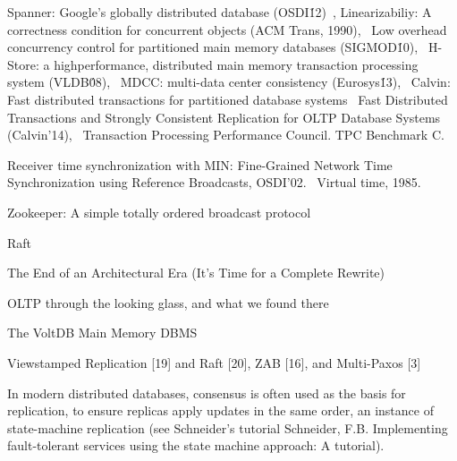 \iffalse
\parab{Bounded delay.}A network with bounded delay can improve reordering delay of \sys. Achieving bounded delay requires the queue length to be bounded and the network to be lossless. Recent years see progress in lossless data center networks~\cite{calder2013don,cheng2014catch,handley2017re} and fast detection of packet losses~\cite{li2016lossradar}.
Bounded queuing delay is also enabled by centralized controller~\cite{perry2015fastpass} or end-to-end flow control~\cite{gao2015phost,cho2017credit}.
\fi



\iffalse


Spanner: Google’s globally distributed database (OSDI\'12)~\cite{corbett2013spanner},
Linearizabiliy: A correctness condition for concurrent objects (ACM Trans, 1990),~\cite{herlihy1990linearizability}
Low overhead concurrency control for partitioned main memory databases (SIGMOD\'10),~\cite{jones2010low}
H-Store: a highperformance,
distributed main memory transaction processing
system (VLDB\'08),~\cite{kallman2008h}
MDCC: multi-data center consistency (Eurosys\'13),~\cite{kraska2013mdcc}
Calvin: Fast distributed transactions for
partitioned database systems~\cite{thomson2012calvin}
Fast Distributed Transactions and Strongly Consistent Replication
for OLTP Database Systems (Calvin'14),~\cite{thomson2014fast}
Transaction Processing Performance Council. TPC
Benchmark C.~\cite{council2005transaction}

Receiver time synchronization with MIN:
Fine-Grained Network Time Synchronization using Reference
Broadcasts, OSDI'02.~\cite{elson2002fine}
Virtual time, 1985.~\cite{jefferson1985virtual}


Zookeeper: A simple totally ordered broadcast protocol

Raft

The End of an Architectural Era
(It’s Time for a Complete Rewrite)

OLTP through the looking glass, and what we found there

The VoltDB Main Memory DBMS

Viewstamped Replication [19] and Raft [20], ZAB [16], and Multi-Paxos [3]

In modern distributed databases, consensus is often used as the basis for replication, to ensure replicas apply updates in the same order, an instance of state-machine replication (see Schneider’s tutorial Schneider, F.B. Implementing fault-tolerant services using the state machine approach: A tutorial).

